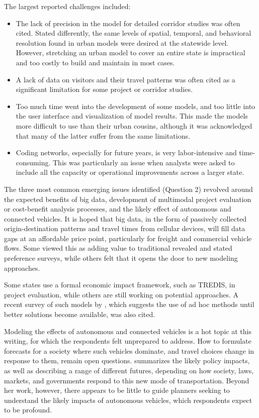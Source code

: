 The largest reported challenges included:

\begin{itemize}
\item
The lack of precision in the model for detailed corridor studies was often cited. Stated differently, the same levels of spatial, temporal, and behavioral resolution found in urban models were desired at the statewide level. However, stretching an urban model to cover an entire state is impractical and too costly to build and maintain in most cases.
\item 
A lack of data on visitors and their travel patterns was often cited as a significant limitation for some project or corridor studies.
\item 
Too much time went into the development of some models, and too little into the user interface and visualization of model results. This made the models more difficult to use than their urban cousins, although it was acknowledged that many of the latter suffer from the same limitations.
\item 
Coding networks, especially for future years, is very labor-intensive and time-consuming. This was particularly an issue when analysts were asked to include all the capacity or operational improvements across a larger state.
\end{itemize}

The three most common emerging issues identified (Question 2) revolved around the expected benefits of big data, development of multimodal project evaluation or cost-benefit analysis processes, and the likely effect of autonomous and connected vehicles. It is hoped that big data, in the form of passively collected origin-destination patterns and travel times from cellular devices, will fill data gaps at an affordable price point, particularly for freight and commercial vehicle flows. Some viewed this as adding value to traditional revealed and stated preference surveys, while others felt that it opens the door to new modeling approaches.

Some states use a formal economic impact framework, such as TREDIS, in project evaluation, while others are still working on potential approaches. A recent survey of such models by \cite{holian16}, which suggests the use of ad hoc methods until better solutions become available, was also cited.

Modeling the effects of autonomous and connected vehicles is a hot topic at this writing, for which the respondents felt unprepared to address. How to formulate forecasts for a society where such vehicles dominate, and travel choices change in response to them, remain open questions. \cite{issac16} summarizes the likely policy impacts, as well as describing a range of different futures, depending on how society, laws, markets, and governments respond to this new mode of transportation. Beyond her work, however, there appears to be little to guide planners seeking to understand the likely impacts of autonomous vehicles, which respondents expect to be profound.

